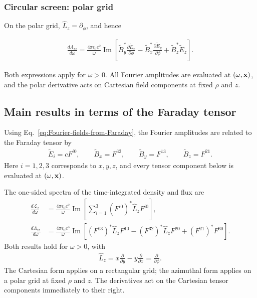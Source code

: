 \subsubsection{Circular screen: polar grid}

On the polar grid, $\hat L_z=\partial_\phi$, and hence
\begin{importantbox}
  \begin{align}
    \frac{d\Lambda_{zz}}{d\omega}
    =\frac{4\pi\epsilon_0c^2}{\omega}\operatorname{Im}\left[
      \tilde B_y^*\frac{\partial\tilde E_x}{\partial\phi}
      -\tilde B_x^*\frac{\partial\tilde E_y}{\partial\phi}
      +\tilde B_z^*\tilde E_z
    \right].
    \label{eq:canonical-oam-flux-polar}
  \end{align}
\end{importantbox}
Both expressions apply for $\omega>0$.  All Fourier amplitudes are evaluated
at $(\omega,{\bf x})$, and the polar derivative acts on Cartesian field
components at fixed $\rho$ and $z$.

\subsection{Main results in terms of the Faraday tensor}

Using Eq.~\eqref{eq:Fourier-fields-from-Faraday}, the Fourier amplitudes
are related to the Faraday tensor by
\begin{align}
  \tilde E_i=cF^{i0},\qquad
  \tilde B_x=F^{32},\qquad
  \tilde B_y=F^{13},\qquad
  \tilde B_z=F^{21}.
\end{align}
Here $i=1,2,3$ corresponds to $x,y,z$, and every tensor component below
is evaluated at $(\omega,{\bf x})$.

\begin{highlightbox}[title={Orbital angular-momentum density and axial flux from the Faraday tensor}]
  The one-sided spectra of the time-integrated density and flux are
  \begin{align}
    \frac{d\mathcal L_z}{d\omega}
    &=\frac{4\pi\epsilon_0c^2}{\omega}
    \operatorname{Im}\left[
      \sum_{i=1}^{3}(F^{i0})^*\hat L_z F^{i0}
    \right],
    \label{eq:canonical-oam-density-Faraday}\\
    \frac{d\Lambda_{zz}}{d\omega}
    &=\frac{4\pi\epsilon_0c^3}{\omega}
    \operatorname{Im}\left[
      (F^{13})^*\hat L_z F^{10}
      -(F^{32})^*\hat L_z F^{20}
      +(F^{21})^*F^{30}
    \right].
    \label{eq:canonical-oam-flux-Faraday}
  \end{align}
  Both results hold for $\omega>0$, with
  \begin{align}
    \hat L_z=x\frac{\partial}{\partial y}
    -y\frac{\partial}{\partial x}
    =\frac{\partial}{\partial\phi}.
  \end{align}
  The Cartesian form applies on a rectangular grid; the azimuthal form
  applies on a polar grid at fixed $\rho$ and $z$.  The derivatives act
  on the Cartesian tensor components immediately to their right.
\end{highlightbox}
